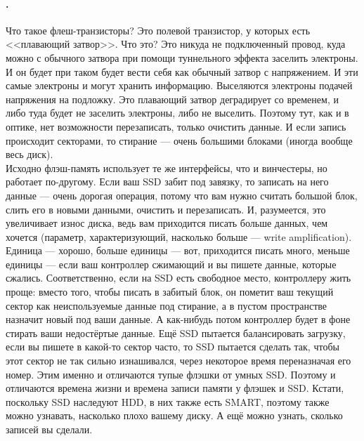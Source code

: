 \documentclass{article}
\begin{document}
    \paragraph{.}
    Что такое флеш-транзисторы? Это полевой транзистор, у которых есть <<плавающий затвор>>. Что это? Это никуда не подключенный провод, куда можно с обычного затвора при помощи туннельного эффекта заселить электроны. И он будет при таком будет вести себя как обычный затвор с напряжением. И эти самые электроны и могут хранить информацию. Выселяются электроны подачей напряжения на подложку. Это плавающий затвор деградирует со временем, и либо туда будет не заселить электроны, либо не выселить. Поэтому тут, как и в оптике, нет возможности перезаписать, только очистить данные. И если запись происходит секторами, то стирание --- очень большими блоками (иногда вообще весь диск).\\
    Исходно флэш-память использует те же интерфейсы, что и винчестеры, но работает по-другому. Если ваш SSD забит под завязку, то записать на него данные --- очень дорогая операция, потому что вам нужно считать большой блок, слить его в новыми данными, очистить и перезаписать. И, разумеется, это увеличивает износ диска, ведь вам приходится писать больше данных, чем хочется (параметр, характеризующий, насколько больше --- write amplification). Единица --- хорошо, больше единицы --- вот, приходится писать много, меньше единицы --- если ваш контроллер сжимающий и вы пишете данные, которые сжались. Соответственно, если на SSD есть свободное место, контроллеру жить проще: вместо того, чтобы писать в забитый блок, он пометит ваш текущий сектор как неиспользуемые данные под стирание, а в пустом пространстве назначит новый под ваши данные. А как-нибудь потом контроллер будет в фоне стирать ваши недостёртые данные. Ещё SSD пытается балансировать загрузку, если вы пишете в какой-то сектор часто, то SSD пытается сделать так, чтобы этот сектор не так сильно изнашивался, через некоторое время переназначая его номер. Этим именно и отличаются тупые флэшки от умных SSD. Поэтому и отличаются времена жизни и времена записи памяти у флэшек и SSD. Кстати, поскольку SSD наследуют HDD, в них также есть SMART, поэтому также можно узнавать, насколько плохо вашему диску. А ещё можно узнать, сколько записей вы сделали.\\
\end{document}
